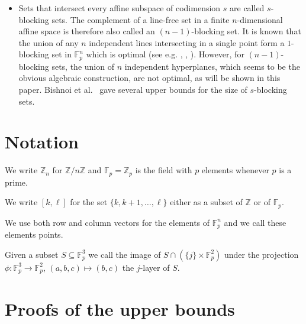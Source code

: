 \documentclass[12pt]{amsart}
\newcommand{\<}{\langle}
\renewcommand{\>}{\rangle}
\numberwithin{equation}{section}
\numberwithin{theorem}{section}
\begin{document}
\begin{itemize}
    \item Sets that intersect every affine subspace of codimension $s$ are called $s$-blocking sets. The complement of a line-free set in a finite $n$-dimensional affine space is therefore also called an $(n-1)$-blocking set. It is known that the union of any $n$ independent lines intersecting in a single point form a $1$-blocking set in $\mathbb{F}_p^n$ which is optimal (see e.g. \cite{AlonTFHA}, \cite{BS}, \cite{Jamison}). However, for $(n-1)$-blocking sets, the union of $n$ independent hyperplanes, which seems to be the obvious algebraic construction, are not optimal, as will be shown in this paper.  Bishnoi et al.~\cite{BDGP} gave several upper bounds for the size of $s$-blocking sets.

\end{itemize}



\section{Notation}
We write $\mathbb{Z}_n$ for $\mathbb{Z}/n\mathbb{Z}$ and $\mathbb{F}_p=\mathbb{Z}_p$ is the field with $p$ elements whenever $p$ is a prime.

We write $[k,\ell]$ for the set $\{k,k+1,\dots,\ell\}$ either as a subset of $\mathbb{Z}$ or of $\mathbb{F}_p$.

We use both row and column vectors for the elements of $\mathbb{F}_p^n$ and we call these elements points.

Given a subset $S\subseteq \mathbb{F}_p^3$ we call the image of $S\cap (\{j\}\times\mathbb{F}_p^2)$ under the projection $\phi\colon\mathbb{F}_p^3\longrightarrow\mathbb{F}_p^2$, $(a,b,c)\mapsto\left(b,c\right)$ the $j$-layer of $S$.



\section{Proofs  of the upper bounds}
\end{document}
